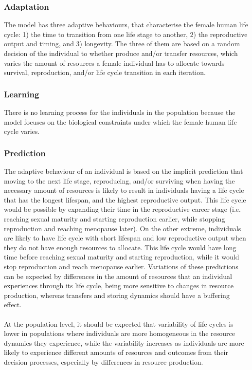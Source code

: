 \documentclass{article}
\begin{document}
\subsubsection{Adaptation}

The model has three adaptive behaviours, that characterise the female human life cycle: 1) the time to transition from one life stage to another, 2) the reproductive output and timing, and 3) longevity. The three of them are based on a random decision of the individual to whether produce and/or transfer resources, which varies the amount of resources a female individual has to allocate towards survival, reproduction, and/or life cycle transition in each iteration.

\subsubsection{Learning}

There is no learning process for the individuals in the population because the model focuses on the biological constraints under which the female human life cycle varies.

\subsubsection{Prediction}

The adaptive behaviour of an individual is based on the implicit prediction that moving to the next life stage, reproducing, and/or surviving when having the necessary amount of resources is likely to result in individuals having a life cycle that has the longest lifespan, and the highest reproductive output. This life cycle would be possible by expanding their time in the reproductive career stage (i.e. reaching sexual maturity and starting reproduction earlier, while stopping reproduction and reaching menopause later). On the other extreme, individuals are likely to have life cycle with short lifespan and low reproductive output when they do not have enough resources to allocate. This life cycle would have long time before reaching sexual maturity and starting reproduction, while it would stop reproduction and reach menopause earlier. Variations of these predictions can be expected by differences in the amount of resources that an individual experiences through its life cycle, being more sensitive to changes in resource production, whereas transfers and storing dynamics should have a buffering effect.
\\\\
At the population level, it should be expected that variability of life cycles is lower in populations where individuals are more homogeneous in the resource dynamics they experience, while the variability increases as individuals are more likely to experience different amounts of resources and outcomes from their decision processes, especially by differences in resource production.
\end{document}
